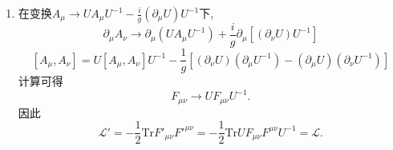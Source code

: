 \documentclass{article}
\begin{document}
\begin{enumerate}
  \item 
  在变换$A_\mu\to UA_\mu U^{-1}-\frac{i}{g}\left(\partial_\mu U\right)U^{-1}$下,
  \begin{equation}
    \partial_\mu A_\nu \to \partial_\mu\left(UA_\mu U^{-1}\right) + \frac{i}{g}\partial_\mu \left[\left(\partial_\nu U\right)U^{-1}\right]
  \end{equation}
  \begin{equation}
    \left[A_\mu, A_\nu\right]=U\left[A_\mu, A_\nu\right]U^{-1}-\frac{1}{g}\left[(\partial_\nu U)(\partial_\mu U^{-1})-(\partial_\mu U)(\partial_\nu U^{-1})\right]
  \end{equation}
  计算可得
  \begin{equation}
    F_{\mu\nu} \to U F_{\mu\nu} U^{-1}.
  \end{equation}
  因此
  \begin{equation}
    \mathcal{L}'=-\frac{1}{2}\mathrm{Tr}F'_{\mu\nu}F'^{\mu\nu}=-\frac{1}{2}\mathrm{Tr}UF_{\mu\nu}F^{\mu\nu}U^{-1}=\mathcal{L}.
  \end{equation}
\end{enumerate}
\end{document}
